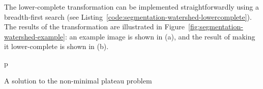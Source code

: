 The lower-complete transformation can be implemented straightforwardly using a breadth-first search (see Listing~\ref{code:segmentation-watershed-lowercomplete}). The results of the transformation are illustrated in Figure~\ref{fig:segmentation-watershed-example}: an example image is shown in (a), and the result of making it lower-complete is shown in (b).

\begin{stusubfig}{p}
%
	\hspace{4mm}%
	\hspace{4mm}%
\caption{A solution to the non-minimal plateau problem}
\label{fig:segmentation-watershed-plateau}
\end{stusubfig}

